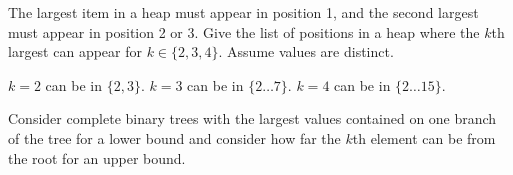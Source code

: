 \question The largest item in a heap must appear in position 1, and the second largest must appear in position 2 or 3. Give the list of positions in a heap where the $k$th largest can appear for $k \in \{2, 3, 4\}$. Assume values are distinct.

\begin{solution}[1in]
$k = 2$ can be in $\{2, 3\}$. $k = 3$ can be in $\{2 \ldots 7\}$. $k = 4$ can be in $\{2 \ldots 15\}$.

Consider complete binary trees with the largest values contained on one branch of the tree for a lower bound and consider how far the $k$th element can be from the root for an upper bound.
\end{solution}